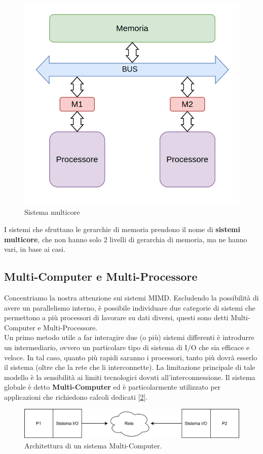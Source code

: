 \begin{figure}
    \centering
    \includegraphics[width=.5\textwidth]{img/P-M-BUS-M-P.png}
    \caption{Sistema multicore}\label{img:multi-core}
\end{figure}

I sistemi che sfruttano le gerarchie di memoria prendono il nome di \textbf{sistemi multicore}, che non hanno solo 2 livelli di gerarchia di memoria, ma ne hanno vari, in base ai casi.

\newpage
\subsection{Multi-Computer e Multi-Processore}
Concentriamo la nostra attenzione sui sistemi MIMD. Escludendo la possibilità di avere un parallelismo interno, è possibile individuare due categorie di sistemi che permettono a più processori di lavorare su dati diversi, questi sono detti Multi-Computer e Multi-Processore.
\\
Un primo metodo utile a far interagire due (o più) sistemi differenti è introdurre un intermediario, ovvero un particolare tipo di sistema di I/O che sia efficace e veloce. In tal caso, quanto più rapidi saranno i processori, tanto più dovrà esserlo il sistema (oltre che la rete che li interconnette). La limitazione principale di tale modello è la sensibilità ai limiti tecnologici dovuti all'interconnessione. Il sistema globale è detto \textbf{Multi-Computer} ed è particolarmente utilizzato per applicazioni che richiedono calcoli dedicati [\ref{fig:multi-computer}].
\begin{figure}[!ht]
    \centering
    \includegraphics[width=0.8\linewidth]{img/multi-processore.png}
    \caption{Architettura di un sistema Multi-Computer.}
    \label{fig:multi-computer}
\end{figure}

